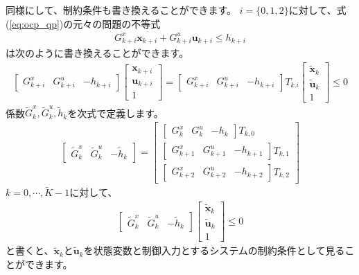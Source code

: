 \documentclass[a4paper]{jarticle}
\begin{document}
同様にして、制約条件も書き換えることができます。
$i=\{0,1,2\}$に対して、式(\ref{eq:ocp_qp})の元々の問題の不等式
\begin{align*}
    G^{x}_{k+i} \mathbf{x}_{k+i} + G^{u}_{k+i}\mathbf{u}_{k+i} \le h_{k+i}
\end{align*}
は次のように書き換えることができます。
\begin{align*}
\begin{bmatrix} G^{x}_{k+i} & G^{u}_{k+i} & -h_{k+i} \end{bmatrix}
\begin{bmatrix} \mathbf{x}_{k+i} \\ \mathbf{u}_{k+i} \\ 1\end{bmatrix}
=
\begin{bmatrix} G^{x}_{k+i} & G^{u}_{k+i} & -h_{k+i} \end{bmatrix}
T_{k.i}
\begin{bmatrix} \tilde{\mathbf{x}}_{k} \\ \tilde{\mathbf{u}}_{k} \\ 1\end{bmatrix}
\le
0
\end{align*}
係数$\tilde{G}^{x}_{k},\tilde{G}^{u}_{k},\tilde{h}_{k}$を次式で定義します。
\begin{align*}
\begin{bmatrix} \tilde{G}^{x}_{k} & \tilde{G}^{u}_{k} & -\tilde{h}_{k} \end{bmatrix}
=
\begin{bmatrix}
\begin{bmatrix}
G^{x}_{k} & G^{u}_{k} & -h_{k}
\end{bmatrix}
T_{k,0}\\
\begin{bmatrix}
G^{x}_{k+1} & G^{u}_{k+1} & -h_{k+1}
\end{bmatrix}
T_{k,1}\\
\begin{bmatrix}
G^{x}_{k+2} & G^{u}_{k+2} & -h_{k+2}
\end{bmatrix}
T_{k,2}
\end{bmatrix}
\end{align*}
$k=0,\cdots,\tilde{K}-1$に対して、
\begin{align}
\begin{bmatrix} \tilde{G}^{x}_{k} & \tilde{G}^{u}_{k} & -\tilde{h}_{k} \end{bmatrix}
\begin{bmatrix} \tilde{\mathbf{x}}_{k} \\ \tilde{\mathbf{u}}_{k} \\ 1\end{bmatrix}
\le 0
  \label{eq:partial_dense_constraint_3}
\end{align}
と書くと、$\tilde{\mathbf{x}}_k$と$\tilde{\mathbf{u}}_k$を状態変数と制御入力とするシステムの制約条件として見ることができます。
\end{document}
